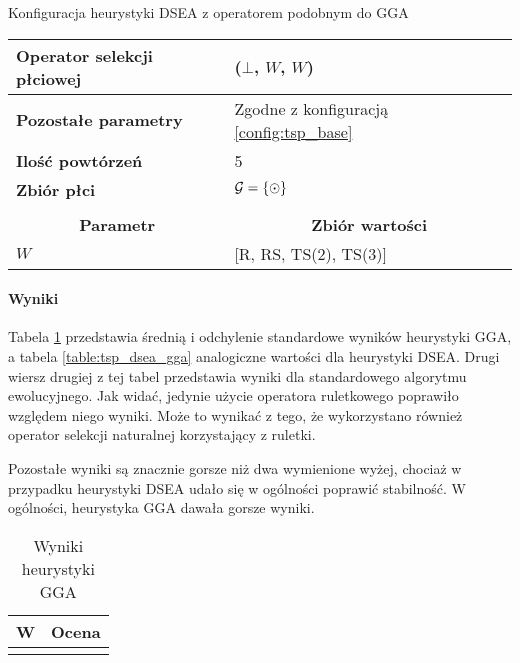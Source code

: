 \documentclass[./FM_mgr.tex]{subfiles}
\begin{document}
\begin{config}
	\caption{Konfiguracja heurystyki DSEA z operatorem podobnym do GGA \label{config:tsp_dsea_gga}}
	\begin{tabularx}{\linewidth}{lX}
		\hline
		\multicolumn{1}{|l|}{{\bf Operator selekcji płciowej}} &
		\multicolumn{1}{l|}{\opName{stdGenSel}($\bot$, $W$, $W$)} \\ 
		\hline
		\multicolumn{1}{|l|}{{\bf Pozostałe parametry}} & 
		\multicolumn{1}{l|}{Zgodne z konfiguracją \ref{config:tsp_base}} \\ 
		\hline
		\multicolumn{1}{|l|}{{\bf Ilość powtórzeń}} &
		\multicolumn{1}{l|}{5} \\ 
		\hline
		\multicolumn{1}{|l|}{{\bf Zbiór płci}} & 
		\multicolumn{1}{l|}{$\mathcal{G} = \{ \odot \}$} \\ 
		\hline
		\hline
		& \\ 
		\hline
		\multicolumn{1}{|c|}{{\bf Parametr}} & 
		\multicolumn{1}{c|}{{\bf Zbiór wartości}} \\ 
		\hline \hline
		\multicolumn{1}{|l|}{$W$} & 
		\multicolumn{1}{l|}{[R, RS, TS(2), TS(3)]} \\ 
		\hline
	\end{tabularx}
\end{config}

\paragraph{Wyniki} Tabela \ref{table:tsp_results_gga} przedstawia średnią i odchylenie standardowe wyników heurystyki GGA, a tabela \ref{table:tsp_dsea_gga} analogiczne wartości dla heurystyki DSEA.
Drugi wiersz drugiej z tej tabel przedstawia wyniki dla standardowego algorytmu ewolucyjnego.
Jak widać, jedynie użycie operatora ruletkowego poprawiło względem niego wyniki. 
Może to wynikać z tego, że wykorzystano również operator selekcji naturalnej korzystający z ruletki.

Pozostałe wyniki są znacznie gorsze niż dwa wymienione wyżej, chociaż w przypadku heurystyki DSEA udało się w ogólności poprawić stabilność.
W ogólności, heurystyka GGA dawała gorsze wyniki.

\begin{table}[h]
	\caption{Wyniki heurystyki GGA \label{table:tsp_results_gga}}
	\centering
	\begin{tabular}{|l|r@{$\pm$}l|}
		\hline
		\multicolumn{1}{|c|}{{\bf W}} & \multicolumn{2}{c|}{{\bf Ocena}} \\ \hline \hline
		\insertData{tsp_gga}
	\end{tabular}
\end{table}
\end{document}
